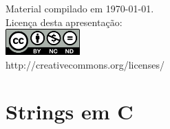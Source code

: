 \documentclass[portuguese,10pt,xcolor=table]{bredelebeamer}
\title{\insertlecture}
\author{Prof. Fernando Figueira\\(adaptado do material do Prof. Rafael Beserra Gomes)}
\institute{UFRN}
\date{}
\begin{document}
\begin{frame}
	\maketitle
	\begin{center}
		\tiny
		Material compilado em \today.\\
		Licença desta apresentação:\\
		\includegraphics[height=1.0cm]{by-nc-nd.png}\\
		http://creativecommons.org/licenses/
	\end{center}
\end{frame}


\def\GN[#1]{\colorbox{gray!40}{#1}}
\def\RN[#1]{\colorbox{red!40}{#1}}
\def\BN[#1]{\colorbox{blue!40}{#1}}
\def\ON[#1]{\colorbox{orange!40}{#1}}
\def\WN[#1]{\colorbox{white!40}{#1}}


	\section{Strings em C}

		\begin{frame}[c]
			\begin{center}
				\structure{\large \insertsection }
			\end{center}
		\end{frame} 
\end{document}
